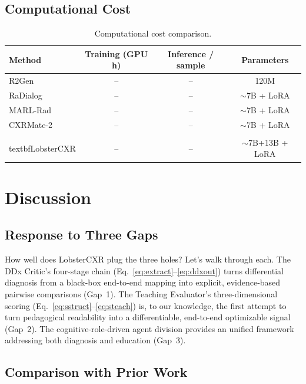 \documentclass[runningheads,10pt]{llncs}
\begin{document}
\subsection{Computational Cost}

\begin{table}[t]
\centering
\caption{Computational cost comparison.}
\label{tab:cost}
\small
\begin{tabular}{lCCC}
\toprule
Method & Training (GPU h) & Inference / sample & Parameters \\
\midrule
R2Gen & -- & -- & 120M \\
RaDialog & -- & -- & $\sim$7B + LoRA \\
MARL-Rad & -- & -- & $\sim$7B + LoRA \\
CXRMate-2 & -- & -- & $\sim$7B + LoRA \\
\\textbf{LobsterCXR} & -- & -- & $\sim$7B+13B + LoRA \\
\bottomrule
\end{tabular}
\end{table}

\section{Discussion}

\subsection{Response to Three Gaps}

How well does LobsterCXR plug the three holes? Let's walk through each. The DDx Critic's four-stage chain (Eq.~\eqref{eq:extract}--\eqref{eq:ddxout}) turns differential diagnosis from a black-box end-to-end mapping into explicit, evidence-based pairwise comparisons (Gap~1). The Teaching Evaluator's three-dimensional scoring (Eq.~\eqref{eq:sstruct}--\eqref{eq:steach}) is, to our knowledge, the first attempt to turn pedagogical readability into a differentiable, end-to-end optimizable signal (Gap~2). The cognitive-role-driven agent division provides an unified framework addressing both diagnosis and education (Gap~3).

\subsection{Comparison with Prior Work}
\end{document}
